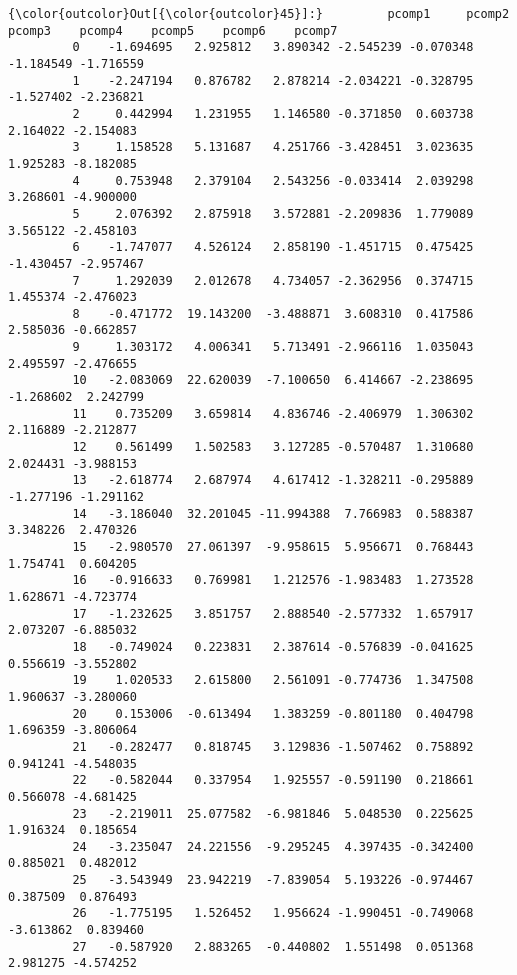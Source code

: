 \documentclass[11pt]{article}
\begin{document}
\begin{Verbatim}[commandchars=\\\{\}]
{\color{outcolor}Out[{\color{outcolor}45}]:}         pcomp1     pcomp2     pcomp3    pcomp4    pcomp5    pcomp6    pcomp7
         0    -1.694695   2.925812   3.890342 -2.545239 -0.070348 -1.184549 -1.716559
         1    -2.247194   0.876782   2.878214 -2.034221 -0.328795 -1.527402 -2.236821
         2     0.442994   1.231955   1.146580 -0.371850  0.603738  2.164022 -2.154083
         3     1.158528   5.131687   4.251766 -3.428451  3.023635  1.925283 -8.182085
         4     0.753948   2.379104   2.543256 -0.033414  2.039298  3.268601 -4.900000
         5     2.076392   2.875918   3.572881 -2.209836  1.779089  3.565122 -2.458103
         6    -1.747077   4.526124   2.858190 -1.451715  0.475425 -1.430457 -2.957467
         7     1.292039   2.012678   4.734057 -2.362956  0.374715  1.455374 -2.476023
         8    -0.471772  19.143200  -3.488871  3.608310  0.417586  2.585036 -0.662857
         9     1.303172   4.006341   5.713491 -2.966116  1.035043  2.495597 -2.476655
         10   -2.083069  22.620039  -7.100650  6.414667 -2.238695 -1.268602  2.242799
         11    0.735209   3.659814   4.836746 -2.406979  1.306302  2.116889 -2.212877
         12    0.561499   1.502583   3.127285 -0.570487  1.310680  2.024431 -3.988153
         13   -2.618774   2.687974   4.617412 -1.328211 -0.295889 -1.277196 -1.291162
         14   -3.186040  32.201045 -11.994388  7.766983  0.588387  3.348226  2.470326
         15   -2.980570  27.061397  -9.958615  5.956671  0.768443  1.754741  0.604205
         16   -0.916633   0.769981   1.212576 -1.983483  1.273528  1.628671 -4.723774
         17   -1.232625   3.851757   2.888540 -2.577332  1.657917  2.073207 -6.885032
         18   -0.749024   0.223831   2.387614 -0.576839 -0.041625  0.556619 -3.552802
         19    1.020533   2.615800   2.561091 -0.774736  1.347508  1.960637 -3.280060
         20    0.153006  -0.613494   1.383259 -0.801180  0.404798  1.696359 -3.806064
         21   -0.282477   0.818745   3.129836 -1.507462  0.758892  0.941241 -4.548035
         22   -0.582044   0.337954   1.925557 -0.591190  0.218661  0.566078 -4.681425
         23   -2.219011  25.077582  -6.981846  5.048530  0.225625  1.916324  0.185654
         24   -3.235047  24.221556  -9.295245  4.397435 -0.342400  0.885021  0.482012
         25   -3.543949  23.942219  -7.839054  5.193226 -0.974467  0.387509  0.876493
         26   -1.775195   1.526452   1.956624 -1.990451 -0.749068 -3.613862  0.839460
         27   -0.587920   2.883265  -0.440802  1.551498  0.051368  2.981275 -4.574252

\end{Verbatim}
\end{document}
